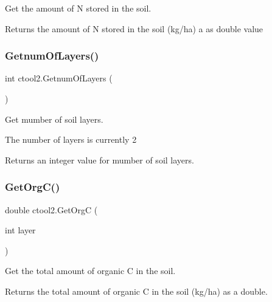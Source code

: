 Get the amount of N stored in the soil. 

\begin{DoxyReturn}{Returns}
the amount of N stored in the soil (kg/ha) a as double value 
\end{DoxyReturn}
\mbox{\label{classctool2_ab86d9eac33a5b0e729a9c08e62ce2cac}} 
\subsubsection{\texorpdfstring{GetnumOfLayers()}{GetnumOfLayers()}}
{\footnotesize\ttfamily int ctool2.\+Getnum\+Of\+Layers (\begin{DoxyParamCaption}{ }\end{DoxyParamCaption})\hspace{0.3cm}{\ttfamily [inline]}}



Get mumber of soil layers. 

The number of layers is currently 2 \begin{DoxyReturn}{Returns}
an integer value for mumber of soil layers. 
\end{DoxyReturn}
\mbox{\label{classctool2_a4fe5c0ef250c6b583869ea8f3a9bfaca}} 
\subsubsection{\texorpdfstring{GetOrgC()}{GetOrgC()}}
{\footnotesize\ttfamily double ctool2.\+Get\+OrgC (\begin{DoxyParamCaption}\item[{int}]{layer }\end{DoxyParamCaption})\hspace{0.3cm}{\ttfamily [inline]}}



Get the total amount of organic C in the soil. 

\begin{DoxyReturn}{Returns}
the total amount of organic C in the soil (kg/ha) as a double. 
\end{DoxyReturn}
\mbox{\label{classctool2_a88804d7d3fe9b3132085ce9db3c16b80}} 
